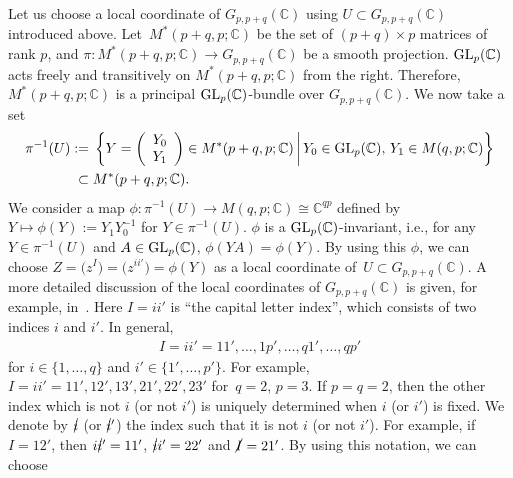 \documentclass[10pt,a4paper]{amsart}
\numberwithin{equation}{section}
\begin{document}
Let us choose a local coordinate of $G_{p,p+q}(\mathbb{C})$ using
$
U
\subset
G_{p,p+q}(\mathbb{C})
$
introduced above. Let~${M^{\ast}(p+q,p;\mathbb{C})}$ be the set of
$
(p+q)
\times
p
$
matrices of rank $p$, and
$
\pi\colon
M^{\ast}(p+q,p;\mathbb{C})
\to
G_{p,p+q}(\mathbb{C})
$
be a smooth projection. ${\rm GL}_{p}(\mathbb{C})$ acts freely and transitively on $M^{\ast}(p+q,p;\mathbb{C})$ from the right. Therefore, $M^{\ast}(p+q,p;\mathbb{C})$ is a principal ${\rm GL}_{p}(\mathbb{C})$-bundle over $G_{p,p+q}(\mathbb{C})$. We now take a set
\begin{align*}%
 \pi^{-1}(U)
:={} &
 \left\{
 Y
 =
 \left(
 \begin{array}{c}
 Y_{0}\\
 Y_{1}
 \end{array}
 \right)
 \in
 M^{\ast}(p+q,p;\mathbb{C})
 \,\bigg|\,
 Y_{0}
 \in
 {\rm GL}_{p}
 (
 \mathbb{C}
 ),\,
 Y_{1}
 \in
 M
 (
 q,p
 ;
 \mathbb{C}
 )
 \right\}\\
 \subset{}&
 M^{\ast}(p+q,p;\mathbb{C})
 .
\end{align*}
We consider a map
$
 \phi
\colon
 \pi^{-1}(U)
 \to
 M(q,p;\mathbb{C})
 \cong\mathbb{C}^{qp}
$
defined by
$
 Y
 \mapsto
 \phi
 (Y)
 :=
 Y_{1}
 Y_{0}^{-1}
$
for
$
Y
\in
\pi^{-1}(U)
$.
$\phi$ is a ${\rm GL}_{p}(\mathbb{C})$-invariant, i.e., for any
$
Y
\in
\pi^{-1}(U)
$
and
$
A
\in
{\rm GL}_{p}(\mathbb{C})
$,
$\phi(YA)=\phi(Y)$. By using this $\phi$, we can choose
$
 Z
 =
 \bigl(
 z^{I}
 \bigr)
 =
 \bigl(
 z^{ii'}
 \bigr)
 =
 \phi
 (Y)
$
as a local coordinate of~$U
\subset
G_{p,p+q}(\mathbb{C})
$.
A more detailed discussion of the local coordinates of $G_{p,p+q}(\mathbb{C})$ is given, for example, in~\cite{KN}.
Here $I=ii'$ is ``the capital letter index'', which consists of two indices $i$ and $i'$. In general,
\begin{align*}
 I = ii' = 11', \dots, 1p', \dots, q1', \dots, qp'
 \end{align*}
for
$i\in \{1,\dots,q \}$
and
$i'\in \{1',\dots,p' \}$.
For example,
$
 I
 =
 ii'
 =
 11',
 12',
 13',
 21',
 22',
 23'
$
for~${
q=2}$,
$p=3
$.
If $p=q=2$, then the other index which is not $i$ (or not $i'$) is uniquely determined when $i$
(or $i'$) is fixed. We denote by $\cancel{i}$ (or $\cancel{i}'$) the index such that it is not $i$ (or not $i'$). For example, if $I=12'$, then
$
i\cancel{i}'=11'$,
$\cancel{i}i'=22'
$
and
$
\cancel{I}
=
21'
$.
By using this notation, we can choose~
\end{document}
